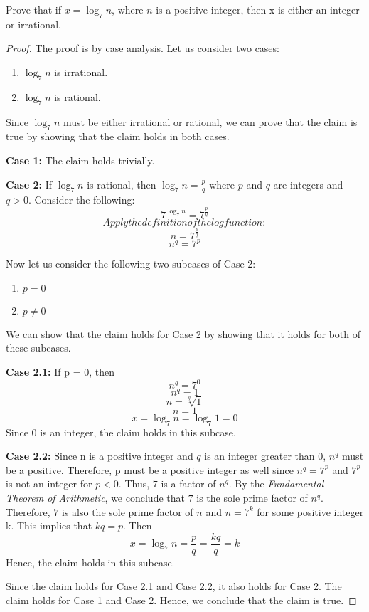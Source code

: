 \documentclass{article}
\begin{document}
Prove that if $x = \log_7 n$, where $n$ is a positive integer, then x is either an integer or irrational.
\begin{proof}
	The proof is by case analysis. Let us consider two cases:
	\begin{enumerate}
		\item $\log_7 n$ is irrational.
		\item $\log_7 n$ is rational.
	\end{enumerate}
	Since $\log_7 n$ must be either irrational or rational, we can prove that the claim is true by showing that the claim holds in both cases.

	\textbf{Case 1:}
	The claim holds trivially.

	\textbf{Case 2:}
	If $\log_7 n$ is rational, then $\log_7 n = \frac{p}{q}$ where $p$ and $q$ are integers and $q > 0$. Consider the following:
	\[
		7^{\log_7 n} = 7^{\frac{p}{q}}
	\]
	\[
		Apply the definition of the log function:
	\]
	\[
		n = 7^{\frac{p}{q}}
	\]
	\[
		n^q = 7^p
	\]

	Now let us consider the following two subcases of Case 2:
	\begin{enumerate}
		\item $p = 0$
		\item $p \neq 0$
	\end{enumerate}
	We can show that the claim holds for Case 2 by showing that it holds for both of these subcases.

	\textbf{Case 2.1:}
	If p = 0, then
	\[
		n^q = 7^0
	\]
	\[
		n^q = 1
	\]
	\[
		n = \sqrt[q]{1}
	\]
	\[
		n = 1
	\]
	\[
		x = \log_7 n = \log_7 1 = 0
	\]
	Since 0 is an integer, the claim holds in this subcase.

	\textbf{Case 2.2:}
	Since n is a positive integer and $q$ is an integer greater than 0, $n^q$ must be a positive. Therefore, p must be a positive integer as well since $n^q = 7^p$ and $7^p$ is not an integer for $p < 0$. Thus, $7$ is a factor of $n^q$. By the \textit{Fundamental Theorem of Arithmetic}, we conclude that $7$ is the sole prime factor of $n^q$.  Therefore, $7$ is also the sole prime factor of $n$ and $n = 7^k$ for some positive integer k. This implies that $k q = p$. Then
	\[
		x = \log_7 n = \frac{p}{q} = \frac{k q}{q} = k
	\]
	Hence, the claim holds in this subcase.

	Since the claim holds for Case 2.1 and Case 2.2, it also holds for Case 2. The claim holds for Case 1 and Case 2. Hence, we conclude that the claim is true.
\end{proof}
\end{document}
